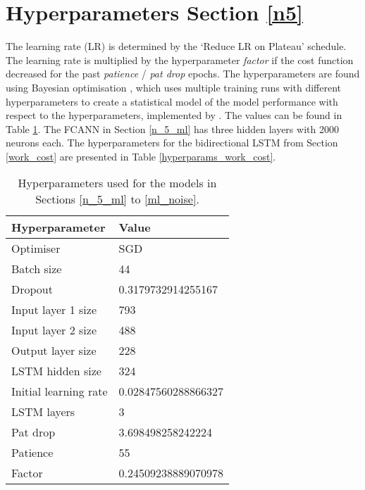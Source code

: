 \section{Hyperparameters Section \ref{n5}}
The learning rate (LR) is determined by the `Reduce LR on Plateau' schedule.
The learning rate is multiplied by the hyperparameter \textit{factor} if the cost function decreased for the past \textit{patience} / \textit{pat drop} epochs.
The hyperparameters are found using Bayesian optimisation \cite{10.5555/2999325.2999464}, which uses multiple training runs with different hyperparameters to create a statistical model of the model performance with respect to the hyperparameters, implemented by \cite{wandb}.
The values can be found in Table \ref{hyperparams_n_5}.
The FCANN in Section \ref{n_5_ml} has three hidden layers with 2000 neurons each.
The hyperparameters for the bidirectional LSTM from Section \ref{work_cost} are presented in Table \ref{hyperparams_work_cost}.

\begin{table}[h]
	\centering
	\begin{tabular}{l | l}
		Hyperparameter & Value \\
		\hline
		Optimiser & SGD \\
		Batch size & 44 \\
		Dropout & 0.3179732914255167 \\
		Input layer 1 size & 793 \\
		Input layer 2 size & 488 \\
		Output layer size & 228 \\
		LSTM hidden size & 324 \\
		Initial learning rate & 0.02847560288866327 \\
		LSTM layers & 3 \\
		Pat drop & 3.698498258242224 \\
		Patience & 55 \\
		Factor & 0.24509238889070978
	\end{tabular}
	\caption{Hyperparameters used for the models in Sections \ref{n_5_ml} to \ref{ml_noise}.}
	\label{hyperparams_n_5}
\end{table}

